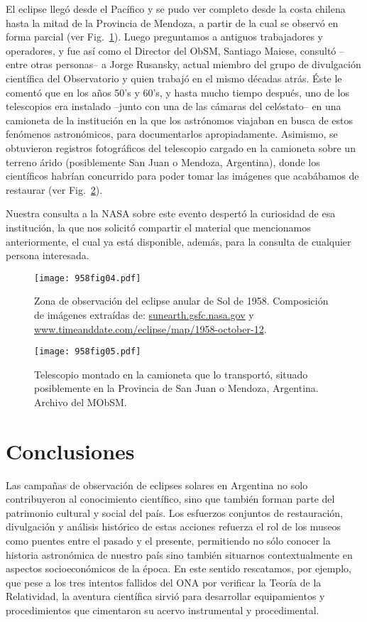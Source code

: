 \documentclass[baaa]{baaa}
\begin{document}
El eclipse llegó desde el Pacífico y se pudo ver completo desde la costa chilena hasta la mitad de la Provincia de Mendoza, a partir de la cual se observó en forma parcial (ver  Fig.~\ref{fig4}).
Luego preguntamos a antiguos trabajadores y operadores, y fue así como el Director del ObSM, Santiago Maiese, consultó --entre otras personas-- a Jorge Rusansky,
actual miembro del grupo de divulgación científica del Observatorio y quien trabajó en el mismo décadas atrás.
Éste le comentó que en los años 50’s y 60’s, y hasta mucho tiempo después,
uno de los telescopios era instalado --junto con una de las cámaras del celóstato-- en una camioneta de la institución en la que los astrónomos viajaban en busca de estos fenómenos 
astronómicos, para documentarlos apropiadamente.
Asimismo, se obtuvieron registros fotográficos del telescopio cargado en la camioneta sobre un terreno árido (posiblemente San Juan o Mendoza, Argentina), donde los científicos habrían
concurrido para poder tomar las imágenes que acabábamos de restaurar (ver  Fig.~\ref{fig5}). 

Nuestra consulta a la NASA sobre este evento despertó la curiosidad de esa institución, la que nos solicitó compartir el material que mencionamos
anteriormente, el cual ya está disponible, además, para la consulta de cualquier persona interesada.

\begin{figure}[!t]
\centering
\texttt{[image: 958fig04.pdf]}
\caption{Zona de observación del eclipse anular de Sol de 1958. Composición de imágenes extraídas de:
\href{https://sunearth.gsfc.nasa.gov}{sunearth.gsfc.nasa.gov} y \href{https://www.timeanddate.com/eclipse/map/1958-october-12}{www.timeanddate.com/eclipse/map/1958-october-12}.}
\label{fig4}
\end{figure}

\begin{figure}[!t]
\centering
\texttt{[image: 958fig05.pdf]}
\caption{Telescopio montado en la camioneta que lo transportó, situado posiblemente en la Provincia de San Juan o Mendoza, Argentina. Archivo del MObSM.}
\label{fig5}
\end{figure}



\section{Conclusiones}

Las campañas de observación de eclipses solares en Argentina no solo contribuyeron al conocimiento científico, sino que también forman parte del patrimonio cultural y social del país.
Los esfuerzos conjuntos de restauración, divulgación y análisis histórico de estas acciones refuerza el rol de los museos como puentes entre el pasado y el presente,
permitiendo no sólo conocer la historia astronómica de nuestro país sino también situarnos contextualmente en aspectos socioeconómicos de la época.
En este sentido rescatamos, por ejemplo, que pese a los tres intentos fallidos del ONA por verificar la Teoría de la Relatividad, la aventura científica sirvió para desarrollar equipamientos y procedimientos que cimentaron su acervo instrumental y procedimental.
\end{document}
